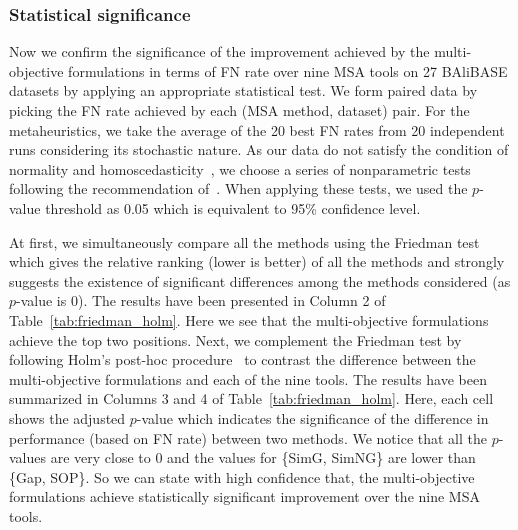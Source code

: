 \subsubsection{Statistical significance}
Now we confirm the significance of the improvement achieved by the multi-objective formulations in terms of FN rate over nine MSA tools on 27 BAliBASE datasets by applying an appropriate statistical test. We form paired data by picking the FN rate achieved by each (MSA method, dataset) pair. For the metaheuristics, we take the average of the 20 best FN rates from 20 independent runs considering its stochastic nature. As our data do not satisfy the condition of normality and homoscedasticity~\citep{sheskin2003handbook}, we choose a series of nonparametric tests following the recommendation of~\cite{derrac2011practical}. When applying these tests, we used the $p$-value threshold as 0.05 which is equivalent to 95\% confidence level.

At first, we simultaneously compare all the methods using the Friedman test~\citep{friedman1937use} which gives the relative ranking (lower is better) of all the methods and strongly suggests the existence of significant differences among the methods considered (as $p$-value is 0). The results have been presented in Column 2 of Table~\ref{tab:friedman_holm}. Here we see that the multi-objective formulations achieve the top two positions. 
Next, we complement the Friedman test by following Holm's post-hoc procedure~\citep{holm1979simple} to contrast the difference between the multi-objective formulations and each of the nine tools. The results have been summarized in Columns 3 and 4 of Table~\ref{tab:friedman_holm}. Here, each cell shows the adjusted $p$-value which indicates the significance of the difference in performance (based on FN rate) between two methods. We notice that all the $p$-values are very close to 0 and the values for \{SimG, SimNG\} are lower than \{Gap, SOP\}. So we can state with high confidence that, the multi-objective formulations achieve statistically significant improvement over the nine MSA tools.

